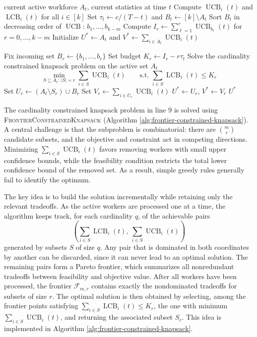 \documentclass[opre,blindrev]{informs3}
\newcommand{\UCB}{\operatorname{UCB}}
\newcommand{\LCB}{\operatorname{LCB}}
\begin{document}
\begin{APPENDICES}
\begin{algorithm}
\caption{\textsc{ChooseTarget-Exact}}
\label{alg:ChooseTarget-Exact}
\begin{algorithmic}[1]
    \Require current active workforce \(A_t\), current statistics at time \(t\)
    \State Compute \(\UCB_i(t)\) and \(\LCB_i(t)\) for all \(i\in[k]\)
    \State Set \(\tau_t \gets c/(T-t)\) and \(B_t \gets [k]\setminus A_t\)
    \State Sort \(B_t\) in decreasing order of \(\UCB\): \(b_1,\dots,b_{k-m}\)
    \State Compute \(I_r \gets \sum_{\ell=1}^r \UCB_{b_\ell}(t)\) for \(r=0,\dots,k-m\)
    \State Initialize \(U^* \gets A_t\) and \(V^* \gets \sum_{i\in A_t}\UCB_i(t)\)

        \State Fix incoming set \(B_r \gets \{b_1,\dots,b_r\}\)
        \State Set budget \(K_r \gets I_r-r\tau_t\)
        \State Solve the cardinality constrained knapsack problem on the active set \(A_t\)
        \[
            \min_{S\subseteq A_t:\,|S|=r}
            \sum_{i\in S}\UCB_i(t)
            \qquad
            \text{s.t. }
            \sum_{i\in S}\LCB_i(t)\le K_r
        \]
            \State Set \(U_r \gets (A_t\setminus S_r)\cup B_r\)
            \State Set \(V_r \gets \sum_{i\in U_r}\UCB_i(t)\)
                \State \(U^*\gets U_r\), \(V^*\gets V_r\)
            \EndIf
        \EndIf
    \EndFor
    \State \Return \(U^*\)
\end{algorithmic}
\end{algorithm}

The cardinality constrained knapsack problem in line 9 is solved using \textsc{FrontierConstrainedKnapsack} (Algorithm \ref{alg:frontier-constrained-knapsack}). A central challenge is that the subproblem is combinatorial: there are \(\binom{m}{r}\) candidate subsets, and the objective and constraint act in competing directions. Minimizing \(\sum_{i\in S}\UCB_i(t)\) favors removing workers with small upper confidence bounds, while the feasibility condition restricts the total lower confidence bound of the removed set. As a result, simple greedy rules generally fail to identify the optimum.

The key idea is to build the solution incrementally while retaining only the relevant tradeoffs. As the active workers are processed one at a time, the algorithm keeps track, for each cardinality \(q\), of the achievable pairs
\[
    \left(\sum_{i\in S}\LCB_i(t),\ \sum_{i\in S}\UCB_i(t)\right)
\]
generated by subsets \(S\) of size \(q\). Any pair that is dominated in both coordinates by another can be discarded, since it can never lead to an optimal solution. The remaining pairs form a Pareto frontier, which summarizes all nonredundant tradeoffs between feasibility and objective value. After all workers have been processed, the frontier \(\mathcal{F}_{m,r}\) contains exactly the nondominated tradeoffs for subsets of size \(r\). The optimal solution is then obtained by selecting, among the frontier points satisfying \(\sum_{i\in S}\LCB_i(t)\le K_r\), the one with minimum \(\sum_{i\in S}\UCB_i(t)\), and returning the associated subset \(S_r\). This idea is implemented in Algorithm \ref{alg:frontier-constrained-knapsack}.


\end{APPENDICES}
\end{document}
